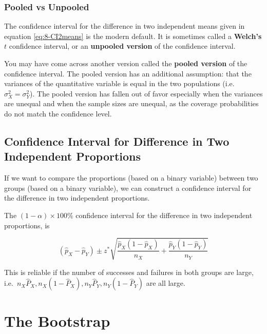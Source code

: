 \documentclass[
]{book}
\theoremstyle{definition}
\theoremstyle{definition}
\theoremstyle{definition}
\theoremstyle{definition}
\theoremstyle{remark}
\begin{document}
\hypertarget{pooled}{%
\subsection{Pooled vs Unpooled}\label{pooled}}

The confidence interval for the difference in two independent means given in equation \eqref{eq:8-CI2means} is the modern default. It is sometimes called a \textbf{Welch's \(t\)} confidence interval, or an \textbf{unpooled version} of the confidence interval.

You may have come across another version called the \textbf{pooled version} of the confidence interval. The pooled version has an additional assumption: that the variances of the quantitative variable is equal in the two populations (i.e.~\(\sigma_X^2 = \sigma_Y^2\)). The pooled version has fallen out of favor especially when the variances are unequal and when the sample sizes are unequal, as the coverage probabilities do not match the confidence level.

\hypertarget{confidence-interval-for-difference-in-two-independent-proportions}{%
\section{Confidence Interval for Difference in Two Independent Proportions}\label{confidence-interval-for-difference-in-two-independent-proportions}}

If we want to compare the proportions (based on a binary variable) between two groups (based on a binary variable), we can construct a confidence interval for the difference in two independent proportions.

The \((1-\alpha) \times 100\%\) confidence interval for the difference in two independent proportions, is

\begin{equation} 
(\hat{p}_X - \hat{p}_Y) \pm z^{*} \sqrt{\frac{\hat{p}_X(1-\hat{p}_X)}{n_X} + \frac{\hat{p}_Y(1-\hat{p}_Y)}{n_Y}}
\label{eq:8-CI2props}
\end{equation}

This is reliable if the number of successes and failures in both groups are large, i.e.~\(n_X \hat{P}_X, n_X (1-\hat{P}_X), n_Y \hat{P}_Y, n_Y (1-\hat{P}_Y)\) are all large.

\hypertarget{boot}{%
\chapter{The Bootstrap}\label{boot}}
\end{document}
